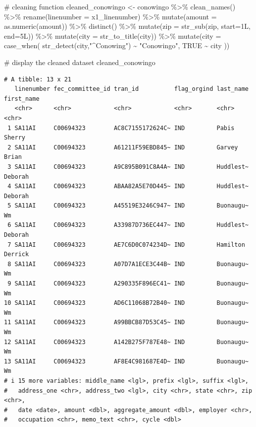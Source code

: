 \documentclass[
  letterpaper,
  DIV=11,
  numbers=noendperiod]{scrreprt}
\newenvironment{Shaded}{\begin{snugshade}}{\end{snugshade}}
\newcommand{\AttributeTok}[1]{\textcolor[rgb]{0.40,0.45,0.13}{#1}}
\newcommand{\CommentTok}[1]{\textcolor[rgb]{0.37,0.37,0.37}{#1}}
\newcommand{\ConstantTok}[1]{\textcolor[rgb]{0.56,0.35,0.01}{#1}}
\newcommand{\FunctionTok}[1]{\textcolor[rgb]{0.28,0.35,0.67}{#1}}
\newcommand{\NormalTok}[1]{\textcolor[rgb]{0.00,0.23,0.31}{#1}}
\newcommand{\OtherTok}[1]{\textcolor[rgb]{0.00,0.23,0.31}{#1}}
\newcommand{\SpecialCharTok}[1]{\textcolor[rgb]{0.37,0.37,0.37}{#1}}
\newcommand{\StringTok}[1]{\textcolor[rgb]{0.13,0.47,0.30}{#1}}
\begin{document}
\begin{Shaded}
\begin{Highlighting}[]
\CommentTok{\# cleaning function}
\NormalTok{cleaned\_conowingo }\OtherTok{\textless{}{-}}\NormalTok{ conowingo }\SpecialCharTok{\%\textgreater{}\%}
  \FunctionTok{clean\_names}\NormalTok{() }\SpecialCharTok{\%\textgreater{}\%}
  \FunctionTok{rename}\NormalTok{(}\AttributeTok{linenumber =}\NormalTok{ x1\_linenumber) }\SpecialCharTok{\%\textgreater{}\%}
  \FunctionTok{mutate}\NormalTok{(}\AttributeTok{amount =} \FunctionTok{as.numeric}\NormalTok{(amount)) }\SpecialCharTok{\%\textgreater{}\%}
  \FunctionTok{distinct}\NormalTok{() }\SpecialCharTok{\%\textgreater{}\%}
  \FunctionTok{mutate}\NormalTok{(}\AttributeTok{zip =} \FunctionTok{str\_sub}\NormalTok{(zip, }\AttributeTok{start=}\NormalTok{1L, }\AttributeTok{end=}\NormalTok{5L)) }\SpecialCharTok{\%\textgreater{}\%}
  \FunctionTok{mutate}\NormalTok{(}\AttributeTok{city =} \FunctionTok{str\_to\_title}\NormalTok{(city)) }\SpecialCharTok{\%\textgreater{}\%}
  \FunctionTok{mutate}\NormalTok{(}\AttributeTok{city =} \FunctionTok{case\_when}\NormalTok{(}
    \FunctionTok{str\_detect}\NormalTok{(city,}\StringTok{"\^{}Conowing"}\NormalTok{) }\SpecialCharTok{\textasciitilde{}} \StringTok{"Conowingo"}\NormalTok{,}
    \ConstantTok{TRUE} \SpecialCharTok{\textasciitilde{}}\NormalTok{ city}
\NormalTok{  ))}


\CommentTok{\# display the cleaned dataset}
\NormalTok{cleaned\_conowingo}
\end{Highlighting}
\end{Shaded}

\begin{verbatim}
# A tibble: 13 x 21
   linenumber fec_committee_id tran_id          flag_orgind last_name first_name
   <chr>      <chr>            <chr>            <chr>       <chr>     <chr>     
 1 SA11AI     C00694323        AC8C7155172624C~ IND         Pabis     Sherry    
 2 SA11AI     C00694323        A61211F59EBD845~ IND         Garvey    Brian     
 3 SA11AI     C00694323        A9C895B091C8A4A~ IND         Huddlest~ Deborah   
 4 SA11AI     C00694323        ABAA82A5E70D445~ IND         Huddlest~ Deborah   
 5 SA11AI     C00694323        A45519E3246C947~ IND         Buonaugu~ Wm        
 6 SA11AI     C00694323        A33987D736EC447~ IND         Huddlest~ Deborah   
 7 SA11AI     C00694323        AE7C6D0C074234D~ IND         Hamilton  Derrick   
 8 SA11AI     C00694323        A07D7A1ECE3C44B~ IND         Buonaugu~ Wm        
 9 SA11AI     C00694323        A290335F896EC41~ IND         Buonaugu~ Wm        
10 SA11AI     C00694323        AD6C11068B72B40~ IND         Buonaugu~ Wm        
11 SA11AI     C00694323        A99BBCB87D53C45~ IND         Buonaugu~ Wm        
12 SA11AI     C00694323        A142B275F787E48~ IND         Buonaugu~ Wm        
13 SA11AI     C00694323        AF8E4C981687E4D~ IND         Buonaugu~ Wm        
# i 15 more variables: middle_name <lgl>, prefix <lgl>, suffix <lgl>,
#   address_one <chr>, address_two <lgl>, city <chr>, state <chr>, zip <chr>,
#   date <date>, amount <dbl>, aggregate_amount <dbl>, employer <chr>,
#   occupation <chr>, memo_text <chr>, cycle <dbl>
\end{verbatim}
\end{document}
